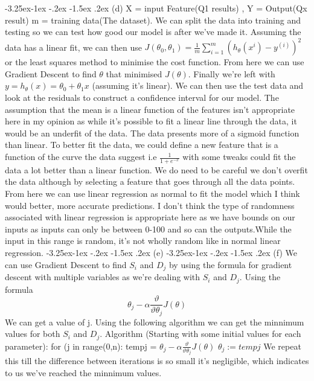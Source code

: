 \documentclass[10pt]{article} %
\makeatletter
\renewcommand\subsection{\@startsection{subsection}{2}{\z@}%
                                     {-3.25ex\@plus -1ex \@minus -.2ex}%
                                     {-1.5ex \@plus .2ex}%
                                     {\normalfont\large\bfseries}}
\makeatother
\begin{document}
\subsection{(d)}
X = input Feature(Q1 results) , Y = Output(Qx result)
\newline m = training data(The dataset). We can split the data into training and testing so we can test how good our model is after we've made it.
\newline Assuming the data has a linear fit, we can then use \(J(\theta_0,\theta_1)=\frac{1}{m}\sum_{i=1}^{m}(h_\theta(x^i)-y^(i))^2\) or the least squares method to minimise the cost function. From here we can use Gradient Descent to find \(\theta\) that minimised \(J(\theta)\). Finally we're left with \(y = h_\theta(x) = \theta_0 +\theta_1x\) (assuming it's linear). We can then use the test data and look at the residuals to construct a confidence interval for our model.
\newline
The assumption that the mean is a linear function of the features isn't appropriate here in my opinion as while it's possible to fit a linear line through the data, it would be an underfit of the data. The data presents more of a sigmoid function than linear. To better fit the data, we could define a new feature that is a function of the curve the data suggest i.e \(\frac{1}{1+e^{-x}}\) with some tweaks could fit the data a lot better than a linear function. We do need to be careful we don't overfit the data although by selecting a feature that goes through all the data points. From here we can use linear regression as normal to fit the model which I think would better, more accurate predictions. 
\newline
I don't think the type of randomness associated with linear regression is appropriate here as we have bounds on our inputs as inputs can only be between 0-100 and so can the outputs.While the input in this range is random, it's not wholly random like in normal linear regression.
\subsection{(e)}
\subsection{(f)}
We can use Gradient Descent to find \(S_i\) and \(D_j\) by using the formula for gradient descent with multiple variables as we're dealing with  \(S_i\) and \(D_j\). Using the formula \[\theta_j - \alpha\frac{\vartheta}{\vartheta\theta_j}J(\theta)\] We can get a value of j. Using the following algorithm we can get the minnimum values for both  \(S_i\) and \(D_j\). 
\newline Algorithm (Starting with some initial values for each parameter):
\newline for (j in range(0,n):
\newline \indent tempj = \(\theta_j - \alpha\frac{\vartheta}{\vartheta\theta_j}J(\theta)\)
\newline \indent \(\theta_j := tempj \)
\newline We repeat this till the difference between iterations is so small it's negligible, which indicates to us we've reached the minnimum values. 
\newpage
\end{document}
